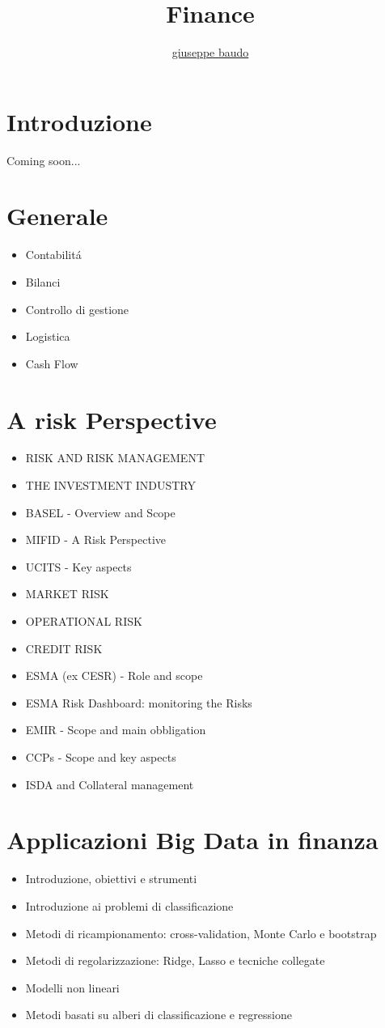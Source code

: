 \documentclass[a4paper,10pt]{article}
\title{Finance}
\author{\href{http://www.baudo.hol.es}{giuseppe baudo}}
\begin{document}
\maketitle

\section{Introduzione}
Coming soon...

\section{Generale}
\begin{itemize}
 \item Contabilit\'{a}
 \item Bilanci
 \item Controllo di gestione
 \item Logistica
 \item Cash Flow
\end{itemize}

\section{A risk Perspective}
\begin{itemize}
	\item RISK AND RISK MANAGEMENT
	\item THE INVESTMENT INDUSTRY
	\item BASEL - Overview and Scope
	\item MIFID - A Risk Perspective
	\item UCITS - Key aspects
	\item MARKET RISK
	\item OPERATIONAL RISK
	\item CREDIT RISK
	\item ESMA (ex CESR) - Role and scope
	\item ESMA Risk Dashboard: monitoring the Risks
	\item EMIR - Scope and main obbligation
	\item CCPs - Scope and key aspects
	\item ISDA and Collateral management
\end{itemize}

\section{Applicazioni Big Data in finanza}
\begin{itemize}
	\item Introduzione, obiettivi e strumenti
	\item Introduzione ai problemi di classificazione
	\item Metodi di ricampionamento: cross-validation, Monte Carlo e bootstrap
	\item Metodi di regolarizzazione: Ridge, Lasso e tecniche collegate
	\item Modelli non lineari
	\item Metodi basati su alberi di classificazione e regressione
\end{itemize}
\end{document}
